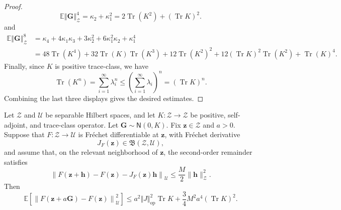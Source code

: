 \documentclass[11pt]{article}
\newcommand{\bbE}{\mathbb{E}}
\begin{document}
\begin{proof}
\begin{equation*}
    \bbE\left\Vert\mathbf G\right\Vert_\mathcal{Z}^4=\kappa_2+\kappa_1^2=2\operatorname{Tr}(K^2)+(\operatorname{Tr} K)^2.
\end{equation*}
and
\begin{align*}
    \bbE\left\Vert\mathbf G\right\Vert_\mathcal{Z}^8&=\kappa_4+4\kappa_1\kappa_3+3\kappa_2^2+6\kappa_1^2\kappa_2+\kappa_1^4\\
    &=48\operatorname{Tr}(K^4)+32\operatorname{Tr}(K)\operatorname{Tr}(K^3)+12\operatorname{Tr}(K^2)^2+12(\operatorname{Tr} K)^2\operatorname{Tr}(K^2)+\operatorname{Tr}(K)^4.
\end{align*}
Finally, since $K$ is positive trace-class, we have
\begin{equation*}
    \operatorname{Tr}(K^n)=\sum_{i=1}^\infty\lambda_i^n\leq\left(
    \sum_{i=1}^\infty\lambda_i\right)^n=(\operatorname{Tr} K)^n.
\end{equation*}
Combining the last three displays gives the desired estimates.
\end{proof}


\begin{lemma}
\label{lem:local_jacobian_decoder_robustness}
Let $\mathcal Z$ and $\mathcal U$ be separable Hilbert spaces, and let $K:\mathcal Z\to\mathcal Z$ be positive, self-adjoint, and trace-class operator.
Let $\mathbf G\sim \mathsf N(0,K)$. Fix $\mathbf z\in\mathcal Z$ and $a>0$. Suppose that $F:\mathcal Z\to\mathcal U$ is Fr\'echet differentiable at $\mathbf z$, with Fr\'echet derivative
\[
    J_{F}(\mathbf z)\in\mathfrak{B}(\mathcal Z,\mathcal U),
\]
and assume that, on the relevant neighborhood of $\mathbf z$, the second-order remainder satisfies
\[
    \left\|F(\mathbf z+\mathbf h)-F(\mathbf z)-J_{F}(\mathbf z)\mathbf h\right\|_{\mathcal U}
    \le\frac{M}{2}\|\mathbf h\|_{\mathcal Z}^2 .
\]
Then
\[
    \mathbb E\left[\left\|F(\mathbf z+a\mathbf G)-F(\mathbf z)\right\|_{\mathcal U}^2
    \right]\le a^2\Vert J\Vert_\mathrm{op}^2\operatorname{Tr} K+\frac{3}{4}M^2a^4(\operatorname{Tr} K)^2.
\]
\end{lemma}
\end{document}

